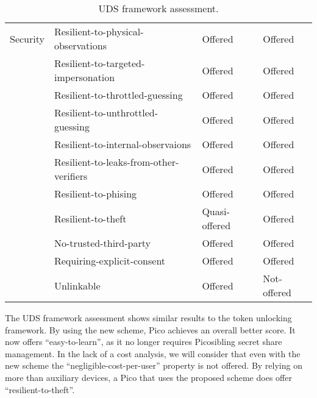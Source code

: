 \begin{table}
\begin{tabular}{c|l|l|l}
    Security      & Resilient-to-physical-observations      & \cellcolor{green!25}Offered       	& \cellcolor{green!25}Offered         \\
    ~             & Resilient-to-targeted-impersonation     & \cellcolor{green!25}Offered       	& \cellcolor{green!25}Offered         \\
    ~             & Resilient-to-throttled-guessing         & \cellcolor{green!25}Offered       	& \cellcolor{green!25}Offered         \\
    ~             & Resilient-to-unthrottled-guessing       & \cellcolor{green!25}Offered       	& \cellcolor{green!25}Offered         \\
    ~             & Resilient-to-internal-observaions       & \cellcolor{green!25}Offered       	& \cellcolor{green!25}Offered         \\
    ~             & Resilient-to-leaks-from-other-verifiers & \cellcolor{green!25}Offered       	& \cellcolor{green!25}Offered         \\
    ~             & Resilient-to-phising                    & \cellcolor{green!25}Offered       	& \cellcolor{green!25}Offered         \\
    ~             & Resilient-to-theft                      & \cellcolor{yellow!25}Quasi-offered 	& \cellcolor{green!25}Offered         \\
    ~             & No-trusted-third-party                  & \cellcolor{green!25}Offered       	& \cellcolor{green!25}Offered         \\
    ~             & Requiring-explicit-consent              & \cellcolor{green!25}Offered       	& \cellcolor{green!25}Offered         \\
    ~             & Unlinkable                              & \cellcolor{green!25}Offered       	& \cellcolor{red!25}Not-offered     \\
    \end{tabular}
	
	\caption{UDS framework assessment.}
	\label{table:udsresults}
\end{table}

The UDS framework assessment shows similar results to the token unlocking framework. By using the new scheme, Pico achieves an overall better score. It now offers ``easy-to-learn'', as it no longer requires Picosibling secret share management. In the lack of a cost analysis, we will consider that even with the new scheme the ``negligible-cost-per-user'' property is not offered. By relying on more than auxiliary devices, a Pico that uses the proposed scheme does offer ``resilient-to-theft''.

